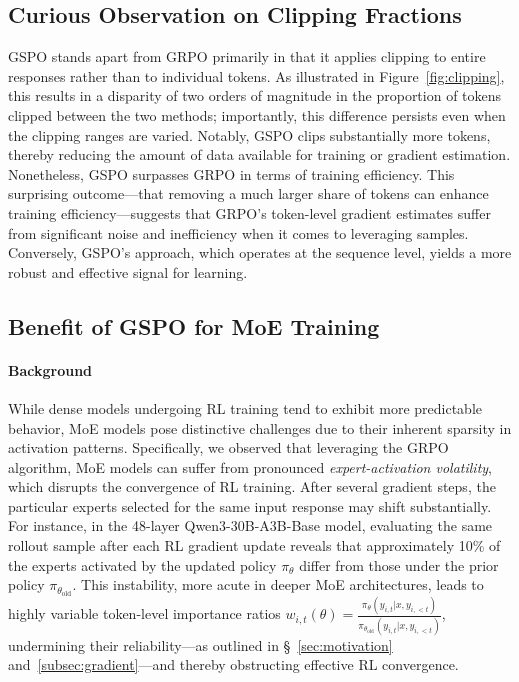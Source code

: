 \subsection{Curious Observation on Clipping Fractions}

GSPO stands apart from GRPO primarily in that it applies clipping to entire responses rather than to individual tokens. As illustrated in Figure~\ref{fig:clipping}, this results in a disparity of two orders of magnitude in the proportion of tokens clipped between the two methods; importantly, this difference persists even when the clipping ranges are varied. Notably, GSPO clips substantially more tokens, thereby reducing the amount of data available for training or gradient estimation. Nonetheless, GSPO surpasses GRPO in terms of training efficiency. This surprising outcome—that removing a much larger share of tokens can enhance training efficiency—suggests that GRPO’s token-level gradient estimates suffer from significant noise and inefficiency when it comes to leveraging samples. Conversely, GSPO’s approach, which operates at the sequence level, yields a more robust and effective signal for learning.

\subsection{Benefit of GSPO for MoE Training}
\label{subsec:routing_replay}

\paragraph{Background}
While dense models undergoing RL training tend to exhibit more predictable behavior, MoE models pose distinctive challenges due to their inherent sparsity in activation patterns. Specifically, we observed that leveraging the GRPO algorithm, MoE models can suffer from pronounced \textit{expert-activation volatility}, which disrupts the convergence of RL training. After several gradient steps, the particular experts selected for the same input response may shift substantially. For instance, in the 48-layer Qwen3-30B-A3B-Base model, evaluating the same rollout sample after each RL gradient update reveals that approximately 10\% of the experts activated by the updated policy $\pi_{\theta}$ differ from those under the prior policy $\pi_{\theta_\text{old}}$. This instability, more acute in deeper MoE architectures, leads to highly variable token-level importance ratios $w_{i,t}(\theta) = \frac{ \pi_{\theta} (y_{i,t} | x, y_{i,<t}) }{ \pi_{\theta_\text{old}} (y_{i,t} | x,y_{i,<t})}$, undermining their reliability—as outlined in \S~\ref{sec:motivation} and~\ref{subsec:gradient}—and thereby obstructing effective RL convergence.

